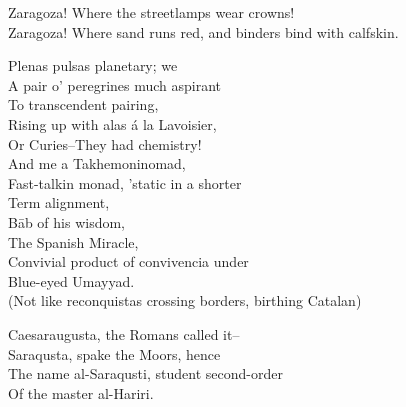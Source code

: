 Zaragoza! Where the streetlamps wear crowns! \\
Zaragoza! Where sand runs red, and binders bind with calfskin. 

Plenas pulsas planetary; we \\
A pair o' peregrines much aspirant \\
To transcendent pairing, \\
Rising up with alas á la Lavoisier, \\
Or Curies--They had chemistry! \\

And me a Takhemoninomad, \\
\quad Fast-talkin monad, 'static in a shorter \\
\qquad Term alignment, \\
Bāb of his wisdom, \\
\quad The Spanish Miracle, \\
\qquad Convivial product of convivencia under \\
Blue-eyed Umayyad. \\
(Not like reconquistas crossing borders, birthing Catalan)

Caesaraugusta, the Romans called it-- \\
Saraqusta, spake the Moors, hence \\
The name al-Saraqusti, student second-order \\
Of the master al-Hariri.